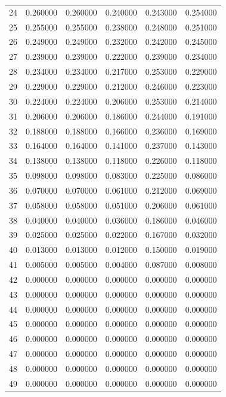 \begin{tabular}{lrrrrr}
24 & 0.260000 & 0.260000 & 0.240000 & 0.243000 & 0.254000 \\
25 & 0.255000 & 0.255000 & 0.238000 & 0.248000 & 0.251000 \\
26 & 0.249000 & 0.249000 & 0.232000 & 0.242000 & 0.245000 \\
27 & 0.239000 & 0.239000 & 0.222000 & 0.239000 & 0.234000 \\
28 & 0.234000 & 0.234000 & 0.217000 & 0.253000 & 0.229000 \\
29 & 0.229000 & 0.229000 & 0.212000 & 0.246000 & 0.223000 \\
30 & 0.224000 & 0.224000 & 0.206000 & 0.253000 & 0.214000 \\
31 & 0.206000 & 0.206000 & 0.186000 & 0.244000 & 0.191000 \\
32 & 0.188000 & 0.188000 & 0.166000 & 0.236000 & 0.169000 \\
33 & 0.164000 & 0.164000 & 0.141000 & 0.237000 & 0.143000 \\
34 & 0.138000 & 0.138000 & 0.118000 & 0.226000 & 0.118000 \\
35 & 0.098000 & 0.098000 & 0.083000 & 0.225000 & 0.086000 \\
36 & 0.070000 & 0.070000 & 0.061000 & 0.212000 & 0.069000 \\
37 & 0.058000 & 0.058000 & 0.051000 & 0.206000 & 0.061000 \\
38 & 0.040000 & 0.040000 & 0.036000 & 0.186000 & 0.046000 \\
39 & 0.025000 & 0.025000 & 0.022000 & 0.167000 & 0.032000 \\
40 & 0.013000 & 0.013000 & 0.012000 & 0.150000 & 0.019000 \\
41 & 0.005000 & 0.005000 & 0.004000 & 0.087000 & 0.008000 \\
42 & 0.000000 & 0.000000 & 0.000000 & 0.000000 & 0.000000 \\
43 & 0.000000 & 0.000000 & 0.000000 & 0.000000 & 0.000000 \\
44 & 0.000000 & 0.000000 & 0.000000 & 0.000000 & 0.000000 \\
45 & 0.000000 & 0.000000 & 0.000000 & 0.000000 & 0.000000 \\
46 & 0.000000 & 0.000000 & 0.000000 & 0.000000 & 0.000000 \\
47 & 0.000000 & 0.000000 & 0.000000 & 0.000000 & 0.000000 \\
48 & 0.000000 & 0.000000 & 0.000000 & 0.000000 & 0.000000 \\
49 & 0.000000 & 0.000000 & 0.000000 & 0.000000 & 0.000000 \\

\end{tabular}
